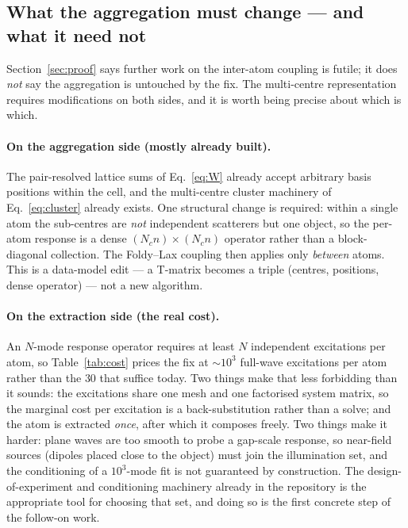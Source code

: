 \documentclass[11pt,a4paper]{article}
\theoremstyle{plain}
\theoremstyle{definition}
\begin{document}
\subsection{What the aggregation must change --- and what it need not}
\label{sec:aggchange}

Section~\ref{sec:proof} says further work on the inter-atom coupling is futile;
it does \emph{not} say the aggregation is untouched by the fix. The multi-centre
representation requires modifications on both sides, and it is worth being
precise about which is which.

\paragraph{On the aggregation side (mostly already built).} The pair-resolved
lattice sums of Eq.~\eqref{eq:W} already accept arbitrary basis positions within
the cell, and the multi-centre cluster machinery of Eq.~\eqref{eq:cluster}
already exists. One structural change is required: within a single atom the
sub-centres are \emph{not} independent scatterers but one object, so the per-atom
response is a dense $(N_c n) \times (N_c n)$ operator rather than a block-diagonal
collection. The Foldy--Lax coupling then applies only \emph{between} atoms. This
is a data-model edit --- a T-matrix becomes a triple (centres, positions, dense
operator) --- not a new algorithm.

\paragraph{On the extraction side (the real cost).} An $N$-mode response operator
requires at least $N$ independent excitations per atom, so Table~\ref{tab:cost}
prices the fix at $\sim\!10^{3}$ full-wave excitations per atom rather than the
$30$ that suffice today. Two things make that less forbidding than it sounds:
the excitations share one mesh and one factorised system matrix, so the marginal
cost per excitation is a back-substitution rather than a solve; and the atom is
extracted \emph{once}, after which it composes freely. Two things make it harder:
plane waves are too smooth to probe a gap-scale response, so near-field sources
(dipoles placed close to the object) must join the illumination set, and the
conditioning of a $10^3$-mode fit is not guaranteed by construction. The
design-of-experiment and conditioning machinery already in the repository is the
appropriate tool for choosing that set, and doing so is the first concrete step
of the follow-on work.
\end{document}
